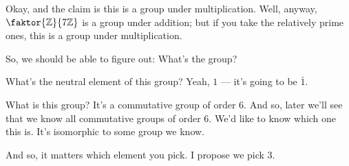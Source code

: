 \begin{content}
\end{content}

\begin{speech}[00:36:50 - 00:37:28]
Okay, and the claim is this is a group under multiplication. Well, anyway, $\faktor{\mathbb{Z}}{7\mathbb{Z}}$ is a group under addition; but if you take the relatively prime ones, this is a group under multiplication.

So, we should be able to figure out: What's the group?

What's the neutral element of this group? Yeah, $1$ --- it's going to be $\bar{1}$.

What is this group? It's a commutative group of order $6$. And so, later we'll see that we know all commutative groups of order $6$. We'd like to know which one this is. It's isomorphic to some group we know.

And so, it matters which element you pick. I propose we pick $3$.
\end{speech}

\begin{hidden}
\end{hidden}

